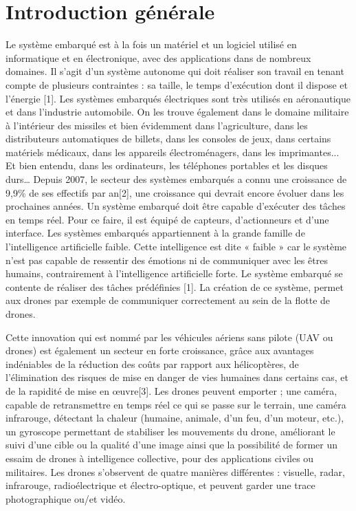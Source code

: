 
\chapter{Introduction générale}
	
Le système embarqué est à la fois un matériel et un logiciel utilisé en informatique et en électronique, avec des applications dans de nombreux domaines. Il s'agit d'un système autonome qui doit réaliser son travail en tenant compte de plusieurs contraintes : sa taille, le temps d'exécution dont il dispose et l'énergie [1]. Les systèmes embarqués électriques sont très utilisés en aéronautique et dans l'industrie automobile. On les trouve également dans le domaine militaire à l'intérieur des missiles et bien évidemment dans l’agriculture, dans les distributeurs automatiques de billets, dans les consoles de jeux, dans certains matériels médicaux, dans les appareils électroménagers, dans les imprimantes... Et bien entendu, dans les ordinateurs, les téléphones portables et les disques durs… Depuis 2007, le secteur des systèmes embarqués a connu une croissance de 9,9\%  de ses effectifs par an[2], une croissance qui devrait encore évoluer dans les prochaines années. Un système embarqué doit être capable d'exécuter des tâches en temps réel. Pour ce faire, il est équipé de capteurs, d'actionneurs et d'une interface. Les systèmes embarqués appartiennent à la grande famille de l'intelligence artificielle faible. Cette intelligence est dite « faible » car le système n'est pas capable de ressentir des émotions ni de communiquer avec les êtres humains, contrairement à l'intelligence artificielle forte. Le système embarqué se contente de réaliser des tâches prédéfinies [1]. La création de ce système, permet aux drones par exemple de communiquer correctement au sein de la flotte de drones. 


Cette innovation qui est nommé par les véhicules aériens sans pilote (UAV ou drones) est également un secteur en forte croissance, grâce aux avantages indéniables de la réduction des coûts par rapport aux hélicoptères, de l’élimination des risques de mise en danger de vies humaines dans certains cas, et de la rapidité de mise en œuvre[3]. Les drones peuvent emporter ; une caméra, capable de retransmettre en temps réel ce qui se passe sur le terrain, une caméra infrarouge, détectant la chaleur (humaine, animale, d'un feu, d'un moteur, etc.), un gyroscope permettant de stabiliser les mouvements du drone, améliorant le suivi d'une cible ou la qualité d'une image ainsi que la possibilité de former un essaim de drones à intelligence collective, pour des applications civiles ou militaires. Les drones s’observent de quatre manières différentes : visuelle, radar, infrarouge, radioélectrique et électro-optique, et peuvent garder une trace photographique ou/et vidéo.


